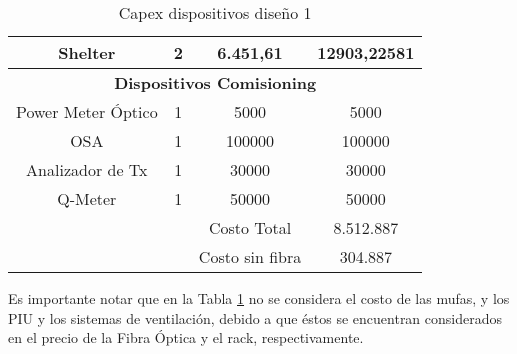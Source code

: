 \begin{table}[H]
\begin{tabular}{cc|c|c|}
\multicolumn{1}{|c|}{Shelter} & 2 & 6.451,61 & 12903,22581 \\ \hline
\multicolumn{4}{|c|}{\textbf{Dispositivos Comisioning}} \\ \hline
\multicolumn{1}{|c|}{Power Meter Óptico} & 1 & 5000 & 5000 \\ \hline
\multicolumn{1}{|c|}{OSA} & 1 & 100000 & 100000 \\ \hline
\multicolumn{1}{|c|}{Analizador de Tx} & 1 & 30000 & 30000 \\ \hline
\multicolumn{1}{|c|}{Q-Meter} & 1 & 50000 & 50000 \\ \hline
 &  & Costo Total & 8.512.887 \\ \cline{3-4} 
\multicolumn{1}{l}{} & \multicolumn{1}{l|}{} & Costo sin fibra & 304.887 \\ \cline{3-4} 
\end{tabular}
\caption{Capex dispositivos diseño 1}
\label{tab:capex_disp_1}
\end{table}

\newp
Es importante notar que en la Tabla \ref{tab:capex_disp_1} no se considera el costo de las mufas, y los PIU y los sistemas de ventilación, debido a que éstos se encuentran considerados en el precio de la Fibra Óptica y el rack, respectivamente.

